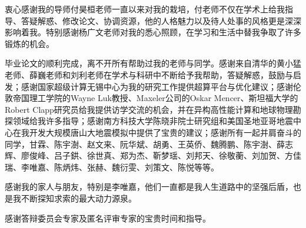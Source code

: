 \begin{acknowledgement}

衷心感谢我的导师付昊桓老师一直以来对我的栽培，付老师不仅在学术上给我指导、答疑解惑、修改论文、协调资源，他的人格魅力以及待人处事的风格更是深深影响着我。特别感谢杨广文老师对我的悉心照顾，在学习和生活中替我争取了许多锻炼的机会。

毕业论文的顺利完成，离不开所有帮助过我的老师与同学。感谢来自清华的黄小猛老师、薛巍老师和刘利老师在学术与科研中不断给予我帮助，答疑解惑，鼓励与启发；感谢国家超级计算无锡中心为我的研究工作提供超算平台与优化建议；感谢伦敦帝国理工学院的Wayne Luk教授、Maxeler公司的Oskar Mencer、斯坦福大学的Robert Clapp研究员给我提供访学交流的机会，并在异构高性能计算和地球物理勘探领域给我许多指导；感谢南方科技大学陈晓非院士研究组和美国圣地亚哥地震中心在我开发大规模唐山大地震模拟中提供了宝贵的建议；感谢所有一起并肩奋斗的同学，甘霖、陈宇澍、赵文来、阮华斌、胡勇、王英侨、魏腾鹏、陈宇澍、薛志辉、廖俊峰、吕子鉷、徐世真、郑为杰、靳梦瑶、刘邦天、徐敬蘅、刘加贺、方佳瑞、李唯嘉、陈炳炜、张赫、魏衍雯、刘策文、陈悦等等。

感谢我的家人与朋友，特别是李唯嘉，他们一直都是我人生道路中的坚强后盾，也是我不断探知求索的最大动力源泉。

感谢答辩委员会专家及匿名评审专家的宝贵时间和指导。
\end{acknowledgement}
